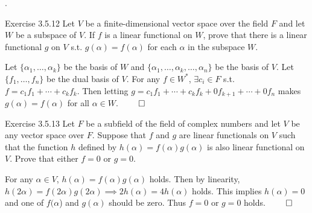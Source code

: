 \documentclass[8pt]{beamer}
\begin{document}
\begin{frame}{.}
    \begin{block}{Exercise 3.5.12}
        Let $V$ be a finite-dimensional vector space over the field $F$ and let $W$ be a subspace of $V$. If $f$ is a linear functional on $W$, prove that there is a linear functional $g$ on $V$ s.t. $g(\alpha) = f(\alpha)$ for each $\alpha$ in the subspace $W$.

        \smallskip
        Let $\{\alpha_1, \dots, \alpha_k \}$ be the basis of $W$ and $\{\alpha_1, \dots, \alpha_k , \dots, \alpha_n \}$ be the basis of $V$.
        Let $\{f_1, \dots, f_n \}$ be the dual basis of $V$.
        For any $f \in W^\ast$, $\exists c_i \in F$ s.t. $f = c_1 f_1 + \cdots + c_k f_k$.
        Then letting $g = c_1 f_1 + \cdots + c_k f_k + 0 f_{k+1} + \cdots + 0 f_n$ makes $g(\alpha) = f(\alpha)$ for all $\alpha \in W$.
        $\qed$
    \end{block}

    \begin{block}{Exercise 3.5.13}
        Let $F$ be a subfield of the field of complex numbers and let $V$ be any vector space over $F$.
        Suppose that $f$ and $g$ are linear functionals on $V$ such that the function $h$ defined by $h(\alpha) = f(\alpha) g(\alpha)$ is also linear functional on $V$.
        Prove that either $f=0$ or $g=0$.

        For any $\alpha \in V$, $h(\alpha) = f(\alpha)g(\alpha)$ holds.
        Then by linearity, $h(2\alpha) = f(2\alpha)g(2\alpha) \implies 2h(\alpha) = 4h(\alpha)$ holds.
        This implies $h(\alpha) = 0$ and one of $f(\alpha$) and $g(\alpha)$ should be zero.
        Thus $f=0$ or $g=0$ holds.
        $\qed$
    \end{block}
\end{frame}
\end{document}
